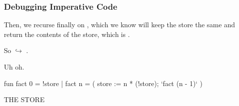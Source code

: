 \documentclass[aspectratio=169, handout]{beamer}
\begin{document}
\begin{frame}[fragile]
  \frametitle{Debugging Imperative Code}

  \begin{minipage}[t][0.6in][t]{\textwidth}
    Then, we recurse finally on , which we know will keep the store
    the same and return the contents of the store, which is .

    \vspace{\fill}

    So  $\hookrightarrow$ .

    \vspace{\fill}

    Uh oh.
  \end{minipage}

  \vspace{10pt}

  \begin{center}
    \begin{minipage}[t][1.7in][t]{0.6\textwidth}
      \vspace{\fill}
      \begin{codeblock}
        fun fact 0 = !store
          | fact n =
              ( store := n * (!store);
                `fact (n - 1)`
              )
      \end{codeblock}
      \vspace{\fill}
    \end{minipage}
    \hfill\vline\hfill
    \begin{minipage}[t][1.7in][t]{0.3\textwidth}
      \centering
      {\hspace{-20pt}\color{gray} \large THE STORE}

      \vspace{\fill}
      \vspace{\fill}
    \end{minipage}
  \end{center}
\end{frame}
\end{document}
